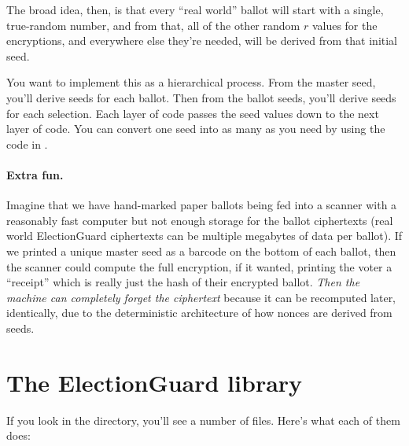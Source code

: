 The broad idea, then, is that every ``real world'' ballot will start
with a single, true-random number, and from that, all of the other
random $r$ values for the encryptions, and everywhere else they're
needed, will be derived from that initial seed.

You want to implement this as a hierarchical process. From the master
seed, you'll derive seeds for each ballot. Then from the ballot seeds,
you'll derive seeds for each selection. Each layer of code passes the seed
values down to the next layer of code. You can convert one seed into
as many as you need by using the code in .

\paragraph{Extra fun.} Imagine that we have hand-marked paper ballots
being fed into a scanner with a reasonably fast computer but not
enough storage for the ballot ciphertexts (real world ElectionGuard
ciphertexts can be multiple megabytes of data per ballot). If we
printed a unique master seed as a barcode on the bottom of each
ballot, then the scanner could compute the full encryption, if it
wanted, printing the voter a ``receipt'' which is really just the hash
of their encrypted ballot. {\em Then the machine can completely forget
the ciphertext} because it can be recomputed later, identically, due to the
deterministic architecture of how nonces are derived from seeds.

\section{The ElectionGuard library}
If you look in the
directory, you'll see a
number of files. Here's what each of them does:

